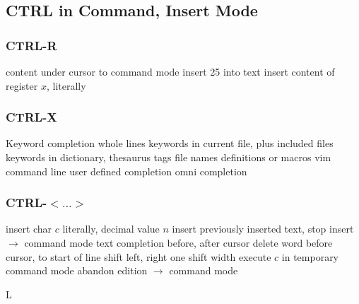 \subsection{CTRL in Command, Insert Mode}	{}
\subsubsection{CTRL-R}{}
	{content under cursor to command mode}
	{insert 25 into text}
	{insert content of register $x$, literally}

\subsubsection{CTRL-X}{Keyword completion}
	{whole lines}
	{keywords in current file, plus included files}
	{keywords in dictionary, thesaurus}
\cmdS{\ctrl{}X\ctrl{}]}	{tags}
	{file names}
	{definitions or macros}
	{vim command line}
	{user defined completion}
	{omni completion}

\subsubsection{CTRL-$<\ldots>$}{}
	{insert char $c$ literally, decimal value $n$}
	{insert previously inserted text, stop insert $\to$ command mode}
	{text completion before, after cursor}
	{delete word before cursor, to start of line}
	{shift left, right one shift width}
	{execute $c$ in temporary command mode}
	{abandon edition $\to$ command mode}


\copyrightnotice

\vfil
\supereject
\if L\lr \else\null\vfill\eject\fi
\bye

